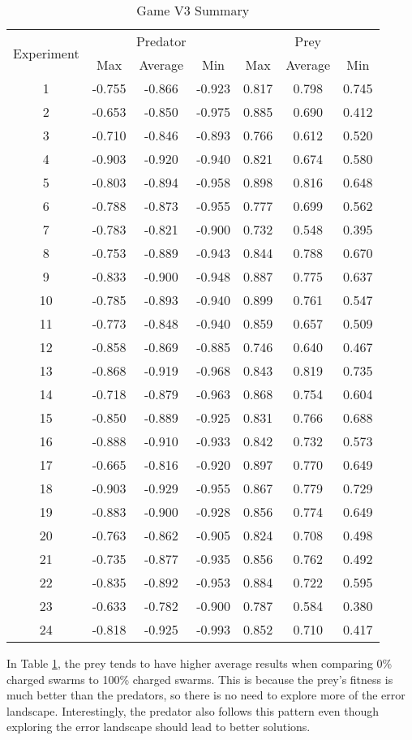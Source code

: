 \begin{table}
  \centering
  \begin{tabular}{|c|c|c|c|c|c|c|}
    \hline
    \multirow{2}{*}{Experiment} & \multicolumn{3}{|c|}{Predator} & \multicolumn{3}{|c|}{Prey} \\\cline{2-7}
    & Max & Average & Min & Max & Average & Min\\
    \hline
    1 & -0.755 & -0.866 & -0.923 & 0.817 & 0.798 & 0.745 \\
2 & -0.653 & -0.850 & -0.975 & 0.885 & 0.690 & 0.412 \\
3 & -0.710 & -0.846 & -0.893 & 0.766 & 0.612 & 0.520 \\
4 & -0.903 & -0.920 & -0.940 & 0.821 & 0.674 & 0.580 \\
5 & -0.803 & -0.894 & -0.958 & 0.898 & 0.816 & 0.648 \\
6 & -0.788 & -0.873 & -0.955 & 0.777 & 0.699 & 0.562 \\
7 & -0.783 & -0.821 & -0.900 & 0.732 & 0.548 & 0.395 \\
8 & -0.753 & -0.889 & -0.943 & 0.844 & 0.788 & 0.670 \\
9 & -0.833 & -0.900 & -0.948 & 0.887 & 0.775 & 0.637 \\
10 & -0.785 & -0.893 & -0.940 & 0.899 & 0.761 & 0.547 \\
11 & -0.773 & -0.848 & -0.940 & 0.859 & 0.657 & 0.509 \\
12 & -0.858 & -0.869 & -0.885 & 0.746 & 0.640 & 0.467 \\
13 & -0.868 & -0.919 & -0.968 & 0.843 & 0.819 & 0.735 \\
14 & -0.718 & -0.879 & -0.963 & 0.868 & 0.754 & 0.604 \\
15 & -0.850 & -0.889 & -0.925 & 0.831 & 0.766 & 0.688 \\
16 & -0.888 & -0.910 & -0.933 & 0.842 & 0.732 & 0.573 \\
17 & -0.665 & -0.816 & -0.920 & 0.897 & 0.770 & 0.649 \\
18 & -0.903 & -0.929 & -0.955 & 0.867 & 0.779 & 0.729 \\
19 & -0.883 & -0.900 & -0.928 & 0.856 & 0.774 & 0.649 \\
20 & -0.763 & -0.862 & -0.905 & 0.824 & 0.708 & 0.498 \\
21 & -0.735 & -0.877 & -0.935 & 0.856 & 0.762 & 0.492 \\
22 & -0.835 & -0.892 & -0.953 & 0.884 & 0.722 & 0.595 \\
23 & -0.633 & -0.782 & -0.900 & 0.787 & 0.584 & 0.380 \\
24 & -0.818 & -0.925 & -0.993 & 0.852 & 0.710 & 0.417 \\

    \hline
  \end{tabular}
  \caption{Game V3 Summary}
  \label{tab:v3-summary}
\end{table}

In Table \ref{tab:v3-summary}, the prey tends to have higher average results when comparing 0\% charged swarms to 100\% charged swarms. This is because the prey's fitness is much better than the predators, so there is no need to explore more of the error landscape. Interestingly, the predator also follows this pattern even though exploring the error landscape should lead to better solutions.